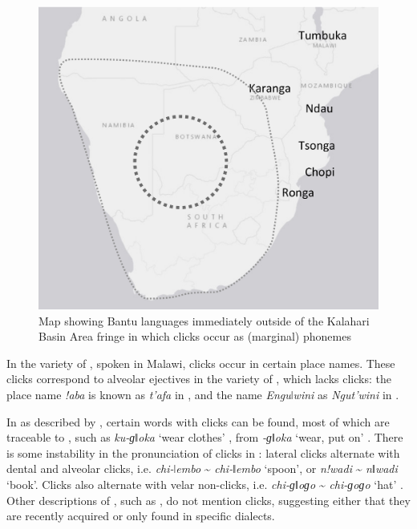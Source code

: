 \documentclass[output=paper,newtxmath,modfonts,nonflat,draftmode]{langsci/langscibook}
\begin{document}
\begin{figure}
\includegraphics[height=.35\textheight]{figures/sands-fig4.png}
\caption{Map showing Bantu languages immediately outside of the Kalahari Basin Area fringe in which clicks occur as (marginal) phonemes}
\label{fig:sands:4}
\end{figure}

\newpage 
In the  variety of , spoken in Malawi, clicks occur in certain place names. These clicks correspond to alveolar ejectives in the  variety of , which lacks clicks: the  place name \textit{!aba} is known as \textit{t’afa} in , and the  name \textit{Enguǀwini} as \textit{Ngut’wini} in  \citep{Moyo1995}. 

In  as described by \citet{Borland1970}, certain words with clicks can be found, most of which are traceable to , such as \textit{ku-ɡǁoka} ‘wear clothes’ \citep[32]{Borland1970}, from  \textit{-ɡǁoka} ‘wear, put on’ \citep[85]{Doke1958}. There is some instability in the pronunciation of clicks in : lateral clicks alternate with dental and alveolar clicks, i.e. \textit{chi-ǀembo} {\textasciitilde} \textit{chi-ǁembo} ‘spoon’, or \textit{n!wadi} {\textasciitilde} \textit{nǁwadi} ‘book’. Clicks also alternate with velar non-clicks, i.e. \textit{chi-ɡǁoɡo} {\textasciitilde} \textit{chi-ɡoɡo} ‘hat’ \citep[30]{Borland1970}. Other descriptions of , such as \citet{Doke1931}, do not mention clicks, suggesting either that they are recently acquired or only found in specific dialects. 
\end{document}
